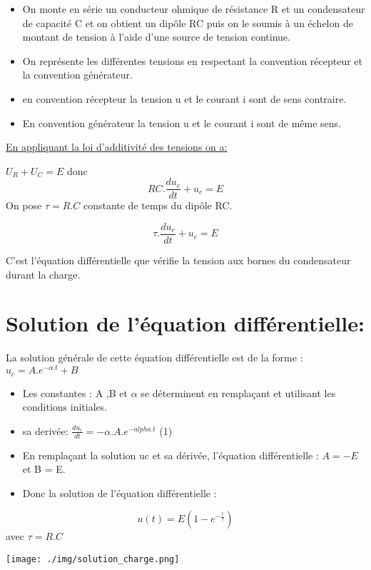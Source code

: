 \documentclass[12pt]{article}
\begin{document}
\begin{itemize}
	\item On monte en série un conducteur ohmique de résistance R et un condensateur de capacité C et on obtient un dipôle RC puis on le
soumis à un échelon de montant de tension à l'aide d'une source de tension continue.


\item On représente les différentes tensions en respectant la convention récepteur et la convention générateur.


	\item en convention récepteur la tension u et le courant i sont de sens contraire.
	\item En convention générateur la tension u et le courant i sont de même sens.
\end{itemize}
\underline{En appliquant la loi d'additivité des tensions on a: }

$U_R + U_C = E$ donc $$RC.\frac{du_c}{dt} + u_c = E$$
On pose $\tau = R.C$  constante de temps du dipôle RC.

$$\tau.\frac{du_c}{dt} + u_c = E$$

C'est l'équation différentielle que vérifie la tension aux bornes du condensateur durant la charge. 


\section*{Solution de l'équation différentielle:}
La solution générale de cette équation différentielle est de la forme : $u_c = A.e^{-\alpha.t} + B$

\begin{itemize}
	\item Les constantes : A ,B et $\alpha$ se déterminent en remplaçant et utilisant les conditions initiales.
	\item sa derivée: $\frac{du_c}{dt} = -\alpha.A.e^{-alpha.t}$ (1)
	\item En remplaçant la solution uc et sa dérivée, l’équation différentielle : $A = -E$ et B = E.
	\item Donc la solution de l'équation différentielle : 
\end{itemize}

$$u(t) = E(1-e^{-\frac{t}{\tau}})$$ avec $\tau = R.C$


\begin{center}

	\texttt{[image: ./img/solution\_charge.png]}
\end{center}
\end{document}
